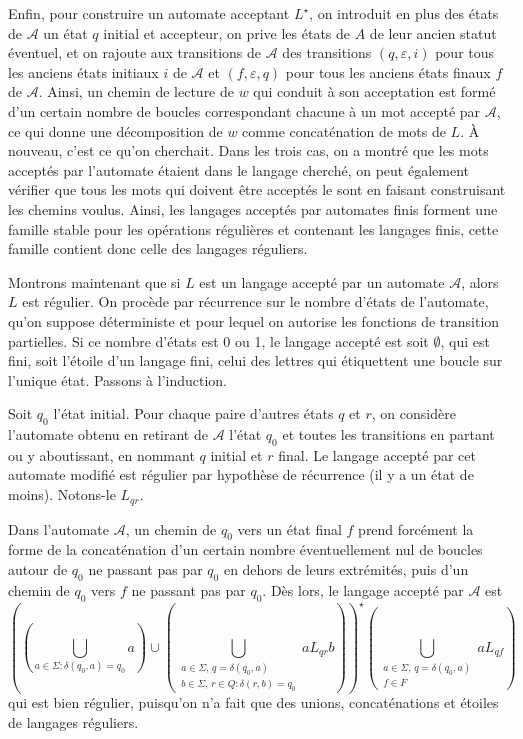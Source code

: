 \begin{preuve}
Enfin, pour construire un automate acceptant $L^\star$, on introduit en plus des états de $\mathcal A$ un état $q$ initial et accepteur, on prive les états de $A$ de leur ancien statut éventuel, et on rajoute aux transitions de $\mathcal A$ des transitions $(q,\varepsilon,i)$ pour tous les anciens états initiaux $i$ de $\mathcal A$ et $(f,\varepsilon,q)$ pour tous les anciens états finaux $f$ de $\mathcal A$. Ainsi, un chemin de lecture de $w$ qui conduit à son acceptation est formé d'un certain nombre de boucles correspondant chacune à un mot accepté par $\mathcal A$, ce qui donne une décomposition de $w$ comme concaténation de mots de $L$. À nouveau, c'est ce qu'on cherchait. Dans les trois cas, on a montré que les mots acceptés par l'automate étaient dans le langage cherché, on peut également vérifier que tous les mots qui doivent être acceptés le sont en faisant construisant les chemins voulus.
Ainsi, les langages acceptés par automates finis forment une famille stable pour les opérations régulières et contenant les langages finis, cette famille contient donc celle des langages réguliers.

Montrons maintenant que si $L$ est un langage accepté par un automate $\mathcal A$, alors $L$ est régulier. On procède par récurrence sur le nombre d'états de l'automate, qu'on suppose déterministe et pour lequel on autorise les fonctions de transition partielles. Si ce nombre d'états est 0 ou 1, le langage accepté est soit $\emptyset$, qui est fini, soit l'étoile d'un langage fini, celui des lettres qui étiquettent une boucle sur l'unique état. Passons à l'induction.

Soit $q_0$ l'état initial. Pour chaque paire d'autres états $q$ et $r$, on considère l'automate obtenu en retirant de $\mathcal A$ l'état $q_0$ et toutes les transitions en partant ou y aboutissant, en nommant $q$ initial et $r$ final. Le langage accepté par cet automate modifié est régulier par hypothèse de récurrence (il y a un état de moins). Notons-le $L_{qr}$.

Dans l'automate $\mathcal A$, un chemin de $q_0$ vers un état final $f$ prend forcément la forme de la concaténation d'un certain nombre éventuellement nul de boucles autour de $q_0$ ne passant pas par $q_0$ en dehors de leurs extrémités, puis d'un chemin de $q_0$ vers $f$ ne passant pas par $q_0$. Dès lors, le langage accepté par $\mathcal A$ est
$$
\left(\left(\bigcup_{a\in\Sigma : \delta(q_0,a) = q_0} a\right) \cup
\left(\bigcup_{\substack{a\in\Sigma,\,q = \delta(q_0, a)\\ b\in \Sigma,\, r\in Q: \delta(r,b) = q_0}} aL_{qr}b\right)
\right) ^\star
\left(
\bigcup_{\substack{a\in\Sigma,\, q = \delta(q_0,a)\\ f\in F}} aL_{qf}
\right)
$$
qui est bien régulier, puisqu'on n'a fait que des unions, concaténations et étoiles de langages réguliers.
\end{preuve}

